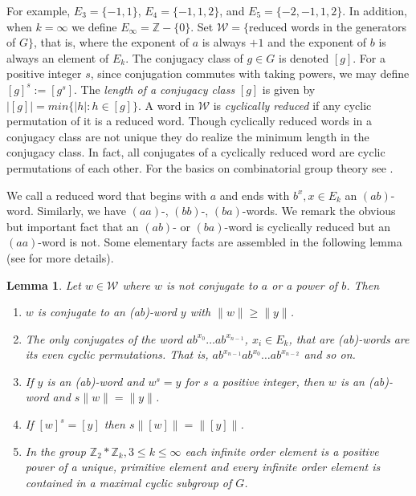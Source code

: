 \documentclass[11pt]{amsart}
\numberwithin{equation}{section}
\theoremstyle{plain}
\newtheorem{lem}[thm]{Lemma}
\begin{document}
For example, $E_3=\{-1,1\}$, $E_4=\{-1,1,2\}$, and $E_5=\{-2,-1,1,2\}$.  In addition, when  $k=\infty$  we define $E_{\infty}=\mathbb{Z}-\{0\}$.  Set  $\mathcal{W}= \{$reduced words in the generators of $G\}$, that is,  where the exponent of $a$ is always $+1$ and the exponent of $b$ is always an element of $E_k$. The conjugacy class of $g \in G$ is denoted $[g]$. 
For a positive integer  $s$, since conjugation  commutes with taking powers,  we may define $[g]^{s}:=[g^{s}]$. 
The {\it length of a conjugacy class}  $[g]$ is given by
$|[g]|  = min \{| h | :h\in [g] \}$. A word in 
$\mathcal{W}$ is {\it cyclically reduced} if any cyclic permutation of it is a reduced word. Though cyclically reduced words  in a conjugacy class are not unique they do realize the minimum length in the conjugacy class.  In fact, all conjugates of a cyclically reduced word are cyclic permutations of each other.  For the basics on combinatorial group theory see \cite{LyndSch, Mag}.

We call a reduced word that begins with $a$ and ends with $b^x, x\in E_k$ an $(ab)$-word.  Similarly, we have $(aa)$-, $(bb)$-, $(ba)$-words. We remark the obvious but important fact that an $(ab)$- or $(ba)$-word is cyclically reduced but an $(aa)$-word is not. Some elementary facts  are assembled in the following lemma (see  \cite{BasSuz}    for more details).

 
 \begin{lem}  \label{lem: conjugates}
 Let $w \in \mathcal{W}$ where $w$ is not conjugate to $a$ or a power of $b$. Then 
 \begin{enumerate}
  \item  $w$ is conjugate to an (ab)-word $y$ with 
  $\lVert w\rVert \geq \lVert y\rVert$.
  \item The only conjugates of the word 
  $ab^{x_0}\dots ab^{x_{n-1}}$, $x_i\in E_k$,  that are   (ab)-words are its even cyclic   permutations. That is, $ab^{x_{n-1}} ab^{x_0}\dots ab^{x_{n-2}}$
  and so on. 
  \item  If $y$ is an (ab)-word and $w^s=y$ for 
  $s$ a positive integer, then $w$ is an (ab)-word  and $s\lVert w\rVert=\lVert y\rVert$.  
  \item   If  $[w]^s=[y]$ then 
  $s \lVert [w]\rVert=\lVert[y]\rVert$.
  \item  In the group $\mathbb{Z}_2\ast \mathbb{Z}_k, 3\leq k\leq\infty$ each infinite order element is a positive  power of a unique, primitive element and every infinite order element is contained in a maximal cyclic subgroup of $G$.

  
\end{enumerate}
\end{lem}
\end{document}
